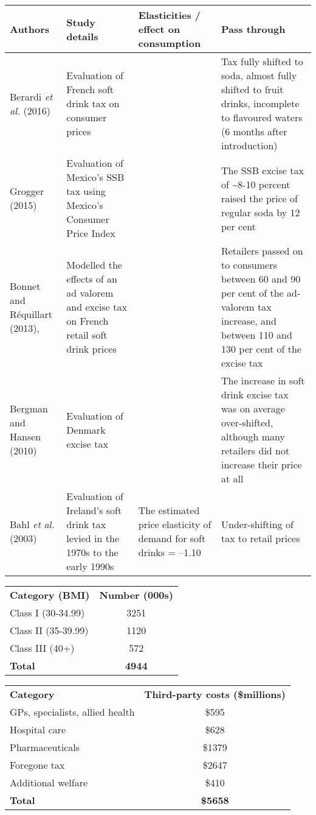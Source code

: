 \onecolumn
\bgroup
\def\arraystretch{1.5}
\begin{tabularx}{\textwidth}{p{3cm}p{5cm}p{5cm}p{10cm}}
\toprule
\textbf{Authors} & \textbf{Study details} & \textbf{Elasticities / effect on consumption} & \textbf{Pass through} \\
\midrule
Berardi \emph{et al.} (2016) & Evaluation of French soft drink tax on consumer prices & & Tax fully shifted to soda, almost fully shifted to fruit drinks, incomplete to flavoured waters (6 months after introduction) \\
Grogger (2015) & Evaluation of Mexico's SSB tax using Mexico's Consumer Price Index & & The SSB excise tax of \textasciitilde{}8-10 percent raised the price of regular soda by 12 per cent \\
Bonnet and R\'equillart (2013), & Modelled the effects of an ad valorem and excise tax on French retail soft drink prices & & Retailers passed on to consumers between 60 and 90 per cent of the ad-valorem tax increase, and between 110 and 130 per cent of the excise tax \\
Bergman and Hansen (2010) & Evaluation of Denmark excise tax & & The increase in soft drink excise tax was on average over-shifted, although many retailers did not increase their price at all \\
Bahl \emph{et al.} (2003) & Evaluation of Ireland's soft drink tax levied in the 1970s to the early 1990s & The estimated price elasticity of demand for soft drinks = --1.10 & Under-shifting of tax to retail prices \\
\bottomrule
\end{tabularx}
\egroup
\twocolumn

\bgroup
\def\arraystretch{1.2}
\begin{tabular}{lc}
\toprule
\textbf{Category (BMI)} & \textbf{Number (000s)} \\ \cmidrule(lr){1-2}
Class I (30-34.99) & 3251 \\
Class II (35-39.99) & 1120 \\
Class III (40+) & 572 \\
\textbf{Total} & \textbf{4944} \\
\bottomrule
\end{tabular}
\egroup

\bgroup
\def\arraystretch{1.2}
\begin{tabular}{lc}
\toprule
\textbf{Category} & \textbf{Third-party costs (\$millions)} \\ \cmidrule(lr){1-2}
GPs, specialists, allied health & \$595 \\
Hospital care & \$628 \\
Pharmaceuticals & \$1379 \\
Foregone tax & \$2647 \\
Additional welfare & \$410 \\
\textbf{Total} & \textbf{\$5658} \\
\bottomrule
\end{tabular}
\egroup


